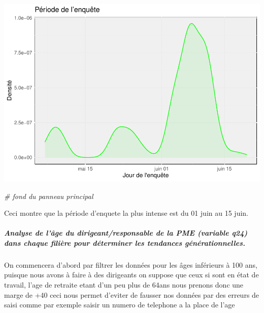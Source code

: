\documentclass[
]{article}
\newenvironment{Shaded}{\begin{snugshade}}{\end{snugshade}}
\newcommand{\CommentTok}[1]{\textcolor[rgb]{0.56,0.35,0.01}{\textit{#1}}}
\begin{document}
\begin{center}\includegraphics{Projet_R_ISE_1_files/figure-latex/unnamed-chunk-29-1} \end{center}

\begin{Shaded}
\begin{Highlighting}[]
                      \CommentTok{\# fond du panneau principal}
\end{Highlighting}
\end{Shaded}

\hfill\break
Ceci montre que la période d'enquete la plus intense est du 01 juin au
15 juin.

\hfill\break

\hypertarget{analyse-de-luxe2ge-du-dirigeantresponsable-de-la-pme-variable-q24-dans-chaque-filiuxe8re-pour-duxe9terminer-les-tendances-guxe9nuxe9rationnelles.}{%
\subparagraph{Analyse de l'âge du dirigeant/responsable de la PME
(variable q24) dans chaque filière pour déterminer les tendances
générationnelles.}\label{analyse-de-luxe2ge-du-dirigeantresponsable-de-la-pme-variable-q24-dans-chaque-filiuxe8re-pour-duxe9terminer-les-tendances-guxe9nuxe9rationnelles.}}

\hfill\break
On commencera d'abord par filtrer les données pour les âges inférieurs à
100 ans, puisque nous avons à faire à des dirigeants on suppose que ceux
si sont en état de travail, l'age de retraite etant d'un peu plus de
64ans nous prenons donc une marge de +40 ceci nous permet d'eviter de
fausser nos données par des erreurs de saisi comme par exemple saisir un
numero de telephone a la place de l'age

\hfill\break
\end{document}
